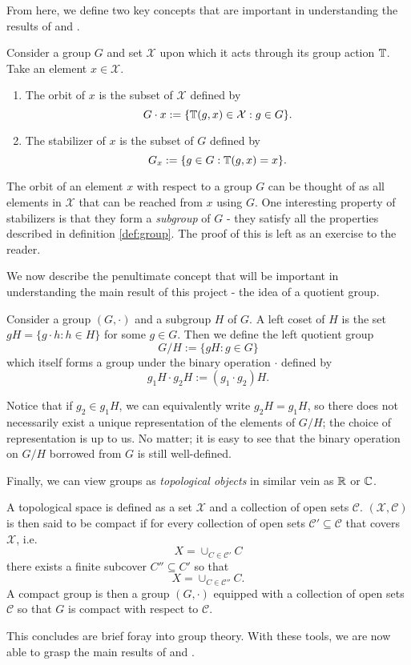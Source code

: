 From here, we define two key concepts that are important in understanding the results of \cite{bloemreddy2019probabilistic} and \cite{kondor2018generalization}.

\begin{definition} \label{def:orbit_stabilizer}
Consider a group $G$ and set $\mathcal{X}$ upon which it acts through its group action $\mathbb{T}$.
Take an element $x \in \mathcal{X}$.
\begin{enumerate}
	\item
	The orbit of $x$ is the subset of $\mathcal{X}$ defined by
	$$
		G \cdot x := \{ \mathbb{T}(g,x) \in \mathcal{X} : g \in G \}.
	$$
	\item
	The stabilizer of $x$ is the subset of $G$ defined by
	$$
		G_x := \{ g \in G : \mathbb{T}(g,x) = x \}.
	$$
\end{enumerate}
\end{definition}

The orbit of an element $x$ with respect to a group $G$ can be thought of as all elements in $\mathcal{X}$ that can be reached from $x$ using $G$.
One interesting property of stabilizers is that they form a \textit{subgroup} of $G$ - they satisfy all the properties described in definition \ref{def:group}.
The proof of this is left as an exercise to the reader.

We now describe the penultimate concept that will be important in understanding the main result of this project - the idea of a quotient group.

\begin{definition} \label{def:quotient}
Consider a group $(G,\cdot)$ and a subgroup $H$ of $G$.
A left coset of $H$ is the set $gH = \{g\cdot h: h \in H\}$ for some $g \in G$.
Then we define the left quotient group
$$
	G/H := \{ gH : g \in G \}
$$
which itself forms a group under the binary operation $\cdot$ defined by
$$
	g_1H \cdot g_2H := (g_1 \cdot g_2) H.
$$
\end{definition}
Notice that if $g_2 \in g_1 H$, we can equivalently write $g_2H = g_1H$, so there does not necessarily exist a unique representation of the elements of $G/H$; the choice of representation is up to us.
No matter; it is easy to see that the binary operation on $G/H$ borrowed from $G$ is still well-defined.

Finally, we can view groups as \textit{topological objects} in similar vein as $\mathbb{R}$ or $\mathbb{C}$.
\begin{definition} \label{def:compact}
A topological space is defined as a set $\mathcal{X}$ and a collection of open sets $\mathcal{C}$.
$(\mathcal{X}, \mathcal{C})$ is then said to be compact if for every collection of open sets $\mathcal{C}' \subseteq \mathcal{C}$ that covers $\mathcal{X}$, i.e.
$$
	X = \cup_{C \in \mathcal{C}'} C
$$
there exists a finite subcover $C'' \subseteq C'$ so that
$$
	X = \cup_{C \in \mathcal{C}''} C.
$$
A compact group is then a group $(G,\cdot)$ equipped with a collection of open sets $\mathcal{C}$ so that $G$ is compact with respect to $\mathcal{C}$.
\end{definition}
\noindent
This concludes are brief foray into group theory.
With these tools, we are now able to grasp the main results of \cite{bloemreddy2019probabilistic} and \cite{kondor2018generalization}.

